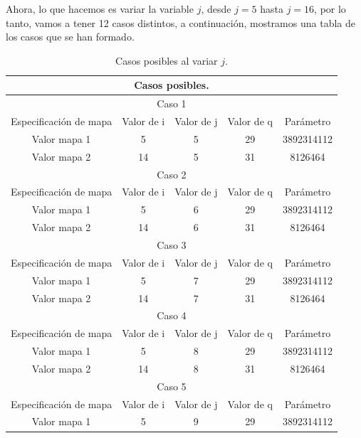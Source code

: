 \documentclass[10pt]{IEEEtran}
\begin{document}
Ahora, lo que hacemos es variar la variable $j$,  desde $j=5$ hasta $j=16$, por lo tanto, vamos a tener 12 casos distintos, a continuación, mostramos una tabla de los casos que se han formado.


\begin{table}[H]
\centering
\caption{Casos posibles al variar $j$.}
\begin{tabular}[c]{|c|c|c|c|c|}
\hline

\multicolumn{5}{|c|}{Casos posibles.}\\
\hline
\hline
\multicolumn{5}{|c|}{Caso 1}\\
\hline
Especificación de mapa & Valor de i & Valor de j & Valor de q & Parámetro \\
\hline
Valor mapa 1 &  5  &  5 & 29 & 3892314112\\

\hline
Valor mapa 2 & 14  & 5 & 31 & 8126464\\
\hline
\hline


\multicolumn{5}{|c|}{Caso 2}\\
\hline
Especificación de mapa & Valor de i & Valor de j & Valor de q & Parámetro \\
\hline
Valor mapa 1 &  5  &  6  & 29 & 3892314112\\

\hline
Valor mapa 2 & 14  &  6  & 31 & 8126464\\
\hline
\hline
\multicolumn{5}{|c|}{Caso 3}\\
\hline
Especificación de mapa & Valor de i & Valor de j & Valor de q & Parámetro \\
\hline
Valor mapa 1 &  5  &  7  & 29 & 3892314112\\

\hline
Valor mapa 2 & 14  &  7  & 31 & 8126464\\
\hline
\hline
\multicolumn{5}{|c|}{Caso 4}\\
\hline
Especificación de mapa & Valor de i & Valor de j & Valor de q & Parámetro \\
\hline
Valor mapa 1 &  5  &  8  & 29 & 3892314112\\

\hline
Valor mapa 2 & 14  &  8  & 31 &  8126464 \\
\hline
\hline
\multicolumn{5}{|c|}{Caso 5}\\
\hline
Especificación de mapa & Valor de i & Valor de j & Valor de q & Parámetro \\
\hline
Valor mapa 1 &  5  &  9 & 29 & 3892314112\\


\end{tabular}
\end{table}
\end{document}
